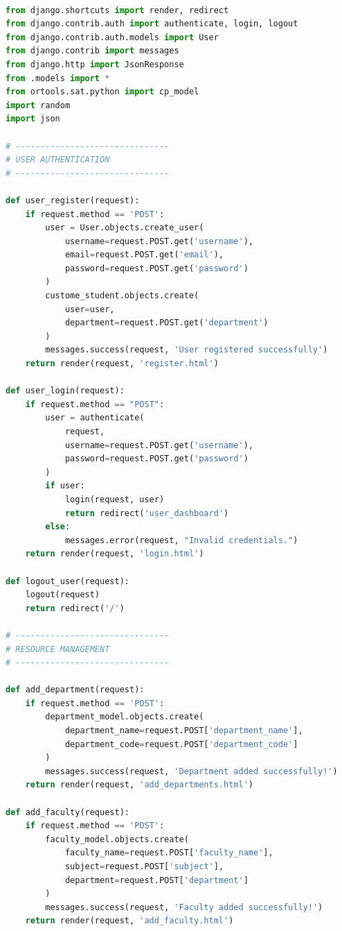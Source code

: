 \documentclass[a4paper, 12pt]{report}
\begin{document}
\begin{lstlisting}[language=Python, caption={Views Implementation for Smart Resource Planner}]

from django.shortcuts import render, redirect
from django.contrib.auth import authenticate, login, logout
from django.contrib.auth.models import User
from django.contrib import messages
from django.http import JsonResponse
from .models import *
from ortools.sat.python import cp_model
import random
import json

# -------------------------------
# USER AUTHENTICATION
# -------------------------------

def user_register(request):
    if request.method == 'POST':
        user = User.objects.create_user(
            username=request.POST.get('username'),
            email=request.POST.get('email'),
            password=request.POST.get('password')
        )
        custome_student.objects.create(
            user=user,
            department=request.POST.get('department')
        )
        messages.success(request, 'User registered successfully')
    return render(request, 'register.html')

def user_login(request):
    if request.method == "POST":
        user = authenticate(
            request,
            username=request.POST.get('username'),
            password=request.POST.get('password')
        )
        if user:
            login(request, user)
            return redirect('user_dashboard')
        else:
            messages.error(request, "Invalid credentials.")
    return render(request, 'login.html')

def logout_user(request):
    logout(request)
    return redirect('/')

# -------------------------------
# RESOURCE MANAGEMENT
# -------------------------------

def add_department(request):
    if request.method == 'POST':
        department_model.objects.create(
            department_name=request.POST['department_name'],
            department_code=request.POST['department_code']
        )
        messages.success(request, 'Department added successfully!')
    return render(request, 'add_departments.html')

def add_faculty(request):
    if request.method == 'POST':
        faculty_model.objects.create(
            faculty_name=request.POST['faculty_name'],
            subject=request.POST['subject'],
            department=request.POST['department']
        )
        messages.success(request, 'Faculty added successfully!')
    return render(request, 'add_faculty.html')


\end{lstlisting}
\end{document}

